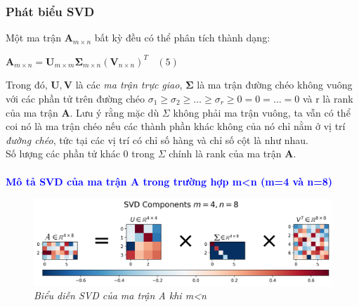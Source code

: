 \subsubsection{Phát biểu SVD}
Một ma trận $\mathbf{A}_{m \times n}$  bất kỳ đều có thể phân tích thành dạng:\\
\begin{center}
	$
	\mathbf{A}_{m \times n} = \mathbf{U}_{m \times m}\mathbf{\Sigma}_{m \times n} (\mathbf{V}_{n \times n})^T ~~~~ (5)$
\end{center}
Trong đó, $\mathbf{U}, \mathbf{V}$  là các \textit{ma trận trực giao}, $\mathbf{\Sigma}$ là ma trận đường chéo không vuông với các phần tử trên đường chéo $\sigma_1 \geq \sigma_2 \geq \dots \geq\sigma_r \geq 0 = 0 = \dots = 0$  và r là rank của ma trận $\mathbf{A}$. Lưu ý rằng mặc dù $\Sigma$  không phải ma trận vuông, ta vẫn có thể coi nó là ma trận chéo nếu các thành phần khác không của nó chỉ nằm ở vị trí \textit{đường chéo}, tức tại các vị trí có chỉ số hàng và chỉ số cột là như nhau.\\
Số lượng các phần tử khác 0 trong $\Sigma$ chính là rank của ma trận $\mathbf{A}$.\\

\\
\textbf{\textcolor{blue}{Mô tả SVD của ma trận A trong trường hợp m<n (m=4 và n=8)}} \\
\begin{figure}[!ht]
	\centering
	\includegraphics[scale=0.3]{svdm_nho_n}
	\caption{\textit{Biểu diễn SVD của ma trận A khi m<n}}\label{fig:Picture}
\end{figure}\\

